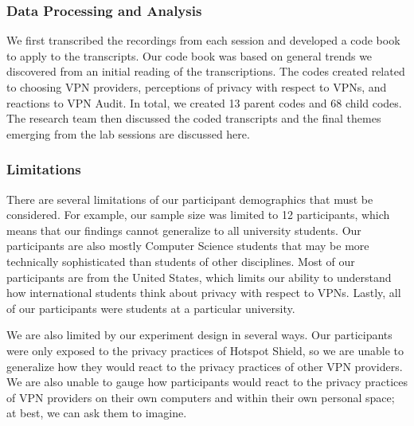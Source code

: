 \subsubsection{Data Processing and Analysis}
We first transcribed the recordings from each session and developed a code book to apply to the transcripts.
Our code book was based on general trends we discovered from an initial reading of the transcriptions.
The codes created related to choosing VPN providers, perceptions of privacy with respect to VPNs, and reactions to VPN Audit.
In total, we created 13 parent codes and 68 child codes.  The research team then discussed the coded transcripts and the final themes emerging from the lab sessions are discussed here.

\subsubsection{Limitations}
There are several limitations of our participant demographics that must be considered.
For example, our sample size was limited to 12 participants, which means that our findings cannot generalize to all university students.
Our participants are also mostly Computer Science students that may be more technically sophisticated than students of other disciplines.
Most of our participants are from the United States, which limits our ability to understand how international students think about privacy with respect to VPNs.
Lastly, all of our participants were students at a particular university.

We are also limited by our experiment design in several ways.
Our participants were only exposed to the privacy practices of Hotspot Shield, so we are unable to generalize how they would react to the privacy practices of other VPN providers.
We are also unable to gauge how participants would react to the privacy practices of VPN providers on their own computers and within their own personal space; at best, we can ask them to imagine.
